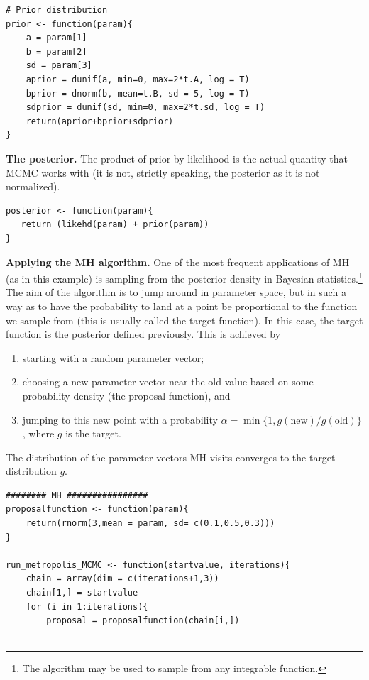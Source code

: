 \begin{Example}
\begin{lstlisting}
# Prior distribution
prior <- function(param){
    a = param[1]
    b = param[2]
    sd = param[3]
    aprior = dunif(a, min=0, max=2*t.A, log = T)
    bprior = dnorm(b, mean=t.B, sd = 5, log = T)
    sdprior = dunif(sd, min=0, max=2*t.sd, log = T)
    return(aprior+bprior+sdprior)
}
\end{lstlisting}

\item \textbf{The posterior.} The product of prior by likelihood is the actual quantity that MCMC works with (it is not, strictly speaking, the posterior as it is not normalized).

\begin{lstlisting}
posterior <- function(param){
   return (likehd(param) + prior(param))
}
\end{lstlisting}
 
\item \textbf{Applying the MH algorithm.} One of the most frequent applications of MH (as in this example) is sampling from the posterior density in Bayesian statistics.\footnote{The algorithm may be used to sample from any integrable function.} The aim of the algorithm is to jump around in parameter space, but in such a way as to have the probability to land at a point be proportional to the function we sample from (this is usually called the target function). In this case, the target function is the posterior defined previously. \newl This is achieved by 
\begin{enumerate}[noitemsep]
\item starting with a random parameter vector;
\item choosing a new parameter vector near the old value based on some probability density (the proposal function), and 
\item jumping to this new point with a probability $\alpha=\min\{1,g(\text{new})/g(\text{old})\}$, where $g$ is the target.\end{enumerate}
The distribution of the parameter vectors MH visits converges to the target distribution $g$.

\begin{lstlisting}
######## MH ################
proposalfunction <- function(param){
    return(rnorm(3,mean = param, sd= c(0.1,0.5,0.3)))
}
 
run_metropolis_MCMC <- function(startvalue, iterations){
    chain = array(dim = c(iterations+1,3))
    chain[1,] = startvalue
    for (i in 1:iterations){
        proposal = proposalfunction(chain[i,])
         

\end{lstlisting}
\end{Example}
